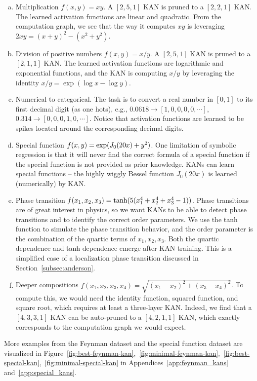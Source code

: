 \documentclass{article}
\numberwithin{equation}{section}
\numberwithin{figure}{section}
\begin{document}
\begin{enumerate}[(a)]
    \item Multiplication $f(x,y)=xy$. A $[2,5,1]$ KAN is pruned to a $[2,2,1]$ KAN. The learned activation functions are linear and quadratic. From the computation graph, we see that the way it computes $xy$ is leveraging $2xy=(x+y)^2-(x^2+y^2)$. 
    \item Division of positive numbers $f(x,y)=x/y$. A $[2,5,1]$ KAN is pruned to a  $[2,1,1]$ KAN. The learned activation functions are logarithmic and exponential functions, and the KAN is computing $x/y$ by leveraging the identity $x/y={\exp}({\log}x-{\log}y)$.
    \item Numerical to categorical. The task is to convert a real number in $[0,1]$ to its first decimal digit (as one hots), e.g., $0.0618\to [1,0,0,0,0,\cdots]$, $0.314\to [0,0,0,1,0,\cdots]$. Notice that activation functions are learned to be spikes located around the corresponding decimal digits.
    \item Special function $f(x,y)={\rm exp}(J_0(20x)+y^2)$. One limitation of symbolic regression is that it will never find the correct formula of a special function if the special function is not provided as prior knowledge. KANs can learn special functions -- the highly wiggly Bessel function $J_0(20x)$ is learned (numerically) by KAN. 
    \item Phase transition $f(x_1,x_2,x_3)={\rm tanh}(5(x_1^4+x_2^4+x_3^4-1))$. Phase transitions are of great interest in physics, so we want KANs to be able to detect phase transitions and to identify the correct order parameters. We use the tanh function to simulate the phase transition behavior, and the order parameter is the combination of the quartic terms of $x_1, x_2, x_3$. Both the quartic dependence and tanh dependence emerge after KAN training. This is a simplified case of a localization phase transition discussed in Section~\ref{subsec:anderson}. 
    \item Deeper compositions $f(x_1,x_2,x_3,x_4)=\sqrt{(x_1-x_2)^2+(x_3-x_4)^2}$. To compute this, we would need the identity function, squared function, and square root, which requires at least a three-layer KAN. Indeed, we find that a $[4,3,3,1]$ KAN can be auto-pruned to a $[4,2,1,1]$ KAN, which exactly corresponds to the computation graph we would expect. 
\end{enumerate}
More examples from the Feynman dataset and the special function dataset are visualized in Figure~\ref{fig:best-feynman-kan},~\ref{fig:minimal-feynman-kan},~\ref{fig:best-special-kan},~\ref{fig:minimal-special-kan} in Appendices~\ref{app:feynman_kans} and~\ref{app:special_kans}.
\end{document}
